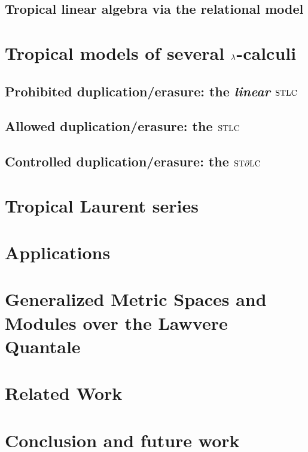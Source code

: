 \documentclass[conference]{IEEEtran}
\begin{document}
\subsection{Tropical linear algebra via the relational model%
}

%

\section{Tropical models of several $\lambda$-calculi}\label{section3}
\subsection{Prohibited duplication/erasure: the \emph{linear} $\mathrm{STLC}$}


\subsection{Allowed duplication/erasure: the $\mathrm{STLC}$}
%

\subsection{Controlled duplication/erasure: the $\mathrm{ST}\partial\mathrm{LC}$}
%


\section{Tropical Laurent series}\label{section4}
%


\section{Applications}\label{sec:app}\label{section5}
%


\section{Generalized Metric Spaces and Modules over the Lawvere Quantale}\label{section6}
%


\section{Related Work}\label{section7}



\section{Conclusion and future work}\label{section8}




\end{document}
